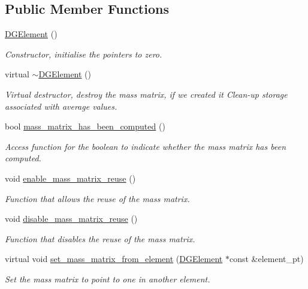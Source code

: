 \subsection*{Public Member Functions}
\begin{DoxyCompactItemize}
\item 
\hyperlink{classoomph_1_1DGElement_a6dfe1d94811fd119007f8a8968876871}{D\+G\+Element} ()
\begin{DoxyCompactList}\small\item\em Constructor, initialise the pointers to zero. \end{DoxyCompactList}\item 
virtual \hyperlink{classoomph_1_1DGElement_acfb3e165aa49a619e11d5ce77f580f33}{$\sim$\+D\+G\+Element} ()
\begin{DoxyCompactList}\small\item\em Virtual destructor, destroy the mass matrix, if we created it Clean-\/up storage associated with average values. \end{DoxyCompactList}\item 
bool \hyperlink{classoomph_1_1DGElement_a5d30dc3eb67c43f9f01db5f1386fc5f8}{mass\+\_\+matrix\+\_\+has\+\_\+been\+\_\+computed} ()
\begin{DoxyCompactList}\small\item\em Access function for the boolean to indicate whether the mass matrix has been computed. \end{DoxyCompactList}\item 
void \hyperlink{classoomph_1_1DGElement_a62c5daa21324a839419ec4feec8e0685}{enable\+\_\+mass\+\_\+matrix\+\_\+reuse} ()
\begin{DoxyCompactList}\small\item\em Function that allows the reuse of the mass matrix. \end{DoxyCompactList}\item 
void \hyperlink{classoomph_1_1DGElement_a1fb4172f65716e0b5277efc65b182d44}{disable\+\_\+mass\+\_\+matrix\+\_\+reuse} ()
\begin{DoxyCompactList}\small\item\em Function that disables the reuse of the mass matrix. \end{DoxyCompactList}\item 
virtual void \hyperlink{classoomph_1_1DGElement_a794df81f734bdab309fe76a713588524}{set\+\_\+mass\+\_\+matrix\+\_\+from\+\_\+element} (\hyperlink{classoomph_1_1DGElement}{D\+G\+Element} $\ast$const \&element\+\_\+pt)
\begin{DoxyCompactList}\small\item\em Set the mass matrix to point to one in another element. \end{DoxyCompactList}\item 

\end{DoxyCompactItemize}
